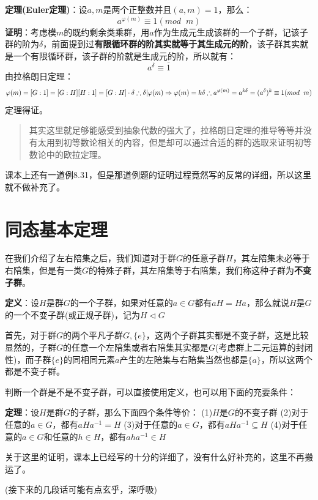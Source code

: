 \documentclass[12pt, a4paper, oneside]{ctexart}
\newenvironment{myquote}{\begin{quote}\small\color{gray}}{\end{quote}}
\begin{document}
\textbf{定理(Euler定理)}：设$a,m$是两个正整数并且$(a,m)=1$，那么：
\[
a^{\varphi(m)}\equiv 1(mod \;\; m)
\]
\textbf{证明}：考虑模$m$的既约剩余类乘群，用$a$作为生成元生成该群的一个子群，记该子群的阶为$\delta$，前面提到过\textbf{有限循环群的阶其实就等于其生成元的阶}，该子群其实就是一个有限循环群，该子群的阶就是生成元的阶，所以就有：
\[
a^\delta \equiv \overline{1}
\]
由拉格朗日定理：
\[
\varphi(m)=[G:1]=[G:H][H:1]=[G:H]\cdot \delta\\
\therefore \delta |\varphi(m)\Rightarrow \varphi(m)=k\delta\\
\therefore a^{\varphi(m)}=a^{k\delta}=(a^\delta)^k\equiv 1(mod \;\;m)
\]
定理得证。

\begin{myquote}
其实这里就足够能感受到抽象代数的强大了，拉格朗日定理的推导等等并没有太用到初等数论相关的内容，但是却可以通过合适的群的选取来证明初等数论中的欧拉定理。
\end{myquote}

课本上还有一道例8.31，但是那道例题的证明过程竟然写的反常的详细，所以这里就不做补充了。

\section{同态基本定理}

在我们介绍了左右陪集之后，我们知道对于群$G$的任意子群$H$，其左陪集未必等于右陪集，但是有一类$G$的特殊子群，其左陪集等于右陪集，我们称这种子群为\textbf{不变子群}。

\textbf{定义}：设$H$是群$G$的一个子群，如果对任意的$a\in G$都有$aH=Ha$，那么就说$H$是$G$的一个不变子群(或正规子群)，记为$H\vartriangleleft G$

首先，对于群$G$的两个平凡子群$G,\{e\}$，这两个子群其实都是不变子群，这是比较显然的，子群$G$的任意一个左陪集或者右陪集其实都是$G$(考虑群上二元运算的封闭性)，而子群$\{e\}$的同相同元素$a$产生的左陪集与右陪集当然也都是$\{a\}$，所以这两个都是不变子群。

判断一个群是不是不变子群，可以直接使用定义，也可以用下面的充要条件：

\textbf{定理}：设$H$是群$G$的子群，那么下面四个条件等价：
(1)$H$是$G$的不变子群
(2)对于任意的$a\in G$，都有$aHa^{-1}=H$
(3)对于任意的$a\in G$，都有$aHa^{-1}\subseteq H$
(4)对于任意的$a\in G$和任意的$h\in H$，都有$aha^{-1}\in H$

关于这里的证明，课本上已经写的十分的详细了，没有什么好补充的，这里不再搬运了。

(接下来的几段话可能有点玄乎，深呼吸)
\end{document}
